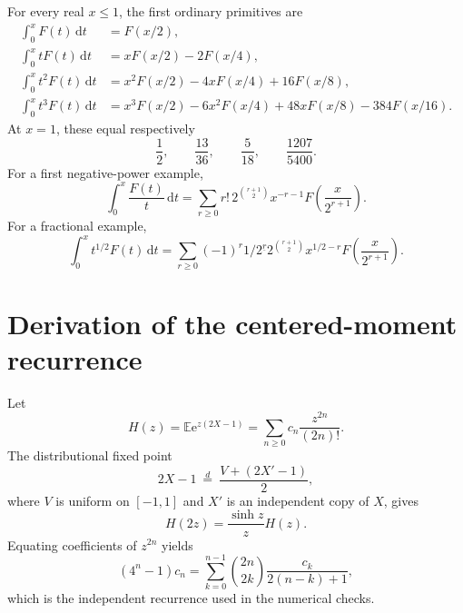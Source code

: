 \documentclass[11pt,oneside]{article}
\theoremstyle{definition}
\theoremstyle{remark}
\newcommand{\E}{\mathbb E}
\newcommand{\dd}{\,\mathrm d}
\newcommand{\e}{\mathrm e}
\newcommand{\fall}[2]{#1^{\underline{#2}}}
\newcommand{\1}{\mathbf 1}
\begin{document}
For every real \(x\leq1\), the first ordinary primitives are
\begin{align}
 \int_0^xF(t)\dd t
 &=F(x/2),                                                     \label{p1:eq:sample-p0}\\
 \int_0^xtF(t)\dd t
 &=xF(x/2)-2F(x/4),                                           \label{p1:eq:sample-p1}\\
 \int_0^xt^2F(t)\dd t
 &=x^2F(x/2)-4xF(x/4)+16F(x/8),                               \label{p1:eq:sample-p2}\\
 \int_0^xt^3F(t)\dd t
 &=x^3F(x/2)-6x^2F(x/4)+48xF(x/8)-384F(x/16).                 \label{p1:eq:sample-p3}
\end{align}
At \(x=1\), these equal respectively
\begin{equation}
 \frac12,\qquad \frac{13}{36},\qquad \frac5{18},\qquad
 \frac{1207}{5400}.                                           \label{p1:eq:sample-definite}
\end{equation}
For a first negative-power example,
\begin{equation}
 \int_0^x\frac{F(t)}t\dd t
 =\sum_{r\geq0}r!\,2^{\binom{r+1}{2}}x^{-r-1}
 F\!\left(\frac{x}{2^{r+1}}\right).                            \label{p1:eq:sample-negative-one}
\end{equation}
For a fractional example,
\begin{equation}
 \int_0^xt^{1/2}F(t)\dd t
 =\sum_{r\geq0}(-1)^r\fall{1/2}{r}
 2^{\binom{r+1}{2}}x^{1/2-r}
 F\!\left(\frac{x}{2^{r+1}}\right).                            \label{p1:eq:sample-half}
\end{equation}

\section{Derivation of the centered-moment recurrence}

Let
\begin{equation}
 H(z)=\E\e^{z(2X-1)}=\sum_{n\geq0}c_n\frac{z^{2n}}{(2n)!}.      \label{p1:eq:H-centered}
\end{equation}
The distributional fixed point
\begin{equation}
 2X-1\ \overset d=\ \frac{V+(2X'-1)}2,                         \label{p1:eq:Y-fixed}
\end{equation}
where \(V\) is uniform on \([-1,1]\) and \(X'\) is an independent copy of
\(X\), gives
\begin{equation}
 H(2z)=\frac{\sinh z}{z}H(z).                                  \label{p1:eq:H-functional}
\end{equation}
Equating coefficients of \(z^{2n}\) yields
\begin{equation}
 (4^n-1)c_n
 =\sum_{k=0}^{n-1}\binom{2n}{2k}\frac{c_k}{2(n-k)+1},          \label{p1:eq:c-recurrence}
\end{equation}
which is the independent recurrence used in the numerical checks.
\end{document}
